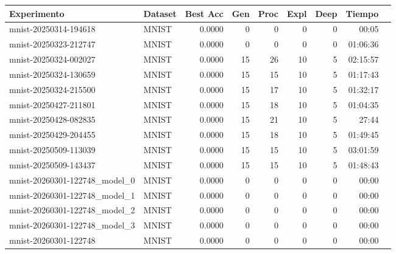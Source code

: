 \begin{tabular}{llrrrrrrr}
\toprule
Experimento & Dataset & Best Acc & Gen & Proc & Expl & Deep & Tiempo \\
\midrule
mnist-20250314-194618 & MNIST & 0.0000 & 0 & 0 & 0 & 0 & 00:05 \\
mnist-20250323-212747 & MNIST & 0.0000 & 0 & 0 & 0 & 0 & 01:06:36 \\
mnist-20250324-002027 & MNIST & 0.0000 & 15 & 26 & 10 & 5 & 02:15:57 \\
mnist-20250324-130659 & MNIST & 0.0000 & 15 & 15 & 10 & 5 & 01:17:43 \\
mnist-20250324-215500 & MNIST & 0.0000 & 15 & 17 & 10 & 5 & 01:32:17 \\
mnist-20250427-211801 & MNIST & 0.0000 & 15 & 18 & 10 & 5 & 01:04:35 \\
mnist-20250428-082835 & MNIST & 0.0000 & 15 & 21 & 10 & 5 & 27:44 \\
mnist-20250429-204455 & MNIST & 0.0000 & 15 & 18 & 10 & 5 & 01:49:45 \\
mnist-20250509-113039 & MNIST & 0.0000 & 15 & 15 & 10 & 5 & 03:01:59 \\
mnist-20250509-143437 & MNIST & 0.0000 & 15 & 15 & 10 & 5 & 01:48:43 \\
mnist-20260301-122748_model_0 & MNIST & 0.0000 & 0 & 0 & 0 & 0 & 00:00 \\
mnist-20260301-122748_model_1 & MNIST & 0.0000 & 0 & 0 & 0 & 0 & 00:00 \\
mnist-20260301-122748_model_2 & MNIST & 0.0000 & 0 & 0 & 0 & 0 & 00:00 \\
mnist-20260301-122748_model_3 & MNIST & 0.0000 & 0 & 0 & 0 & 0 & 00:00 \\
mnist-20260301-122748 & MNIST & 0.0000 & 0 & 0 & 0 & 0 & 00:00 \\
\bottomrule
\end{tabular}